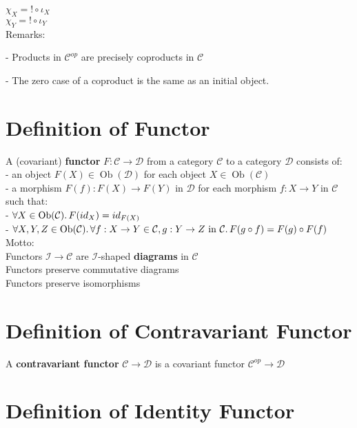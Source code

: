 \documentclass[a4paper, twoside, english, 11pt]{book}
\DeclareMathOperator{\Ob}{Ob}
\newcommand{\C}{\mathcal C}
\newcommand{\D}{\mathcal D}
\newcommand{\I}{\mathcal I}
\begin{document}
$\chi_X = ! \circ \iota_X$ \\
\indent
$\chi_Y = ! \circ  \iota_Y$ \\

\noindent
Remarks:

- Products in $\C^{op}$ are precisely coproducts in $\C$

- The zero case of a coproduct is the same as an initial object.



\section{Definition of Functor}

A (covariant) \textbf{functor} $F : \C \rightarrow \D$ from a category $\C$ to a category $\D$ consists of: \\

- an object $F(X) \in \Ob(\D)$ for each object $X \in \Ob(\C)$ \\

- a morphism $F(f) : F(X) \rightarrow F(Y)$ in $\D$ for each morphism $f : X \rightarrow Y$ in $\C$ \\

\noindent
such that: \\

- $\forall X \in \Ob(\C) \ldotp F(id_X) = id_{F(X)}$ \\

- $\forall X, Y, Z \in \Ob(\C) \ldotp \forall f : X \rightarrow Y \in \C, g : Y \rightarrow Z \text{ in } \C \ldotp F(g \circ f) = F(g) \circ F(f)$ \\

\noindent
Motto: \\
Functors $\I \rightarrow \C$ are $\I$-shaped \textbf{diagrams} in $\C$ \\

\noindent
Functors preserve commutative diagrams \\
Functors preserve isomorphisms



\section{Definition of Contravariant Functor}

A \textbf{contravariant functor} $\C \rightarrow \D$ is a covariant functor $\C^{op} \rightarrow \D$



\section{Definition of Identity Functor}
\end{document}

